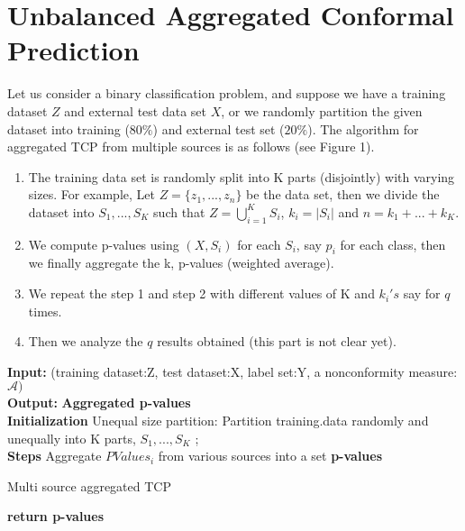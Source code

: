 \documentclass[main]{subfiles}
\begin{document}
\section{Unbalanced Aggregated Conformal Prediction}
Let us consider a binary classification problem, and suppose we have a training dataset $Z$ and  external test data set $X$, or we randomly partition the given dataset into training ($80\%$) and external test set ($20\%$). The algorithm for aggregated TCP from multiple sources is as follows (see Figure 1).
\begin{enumerate}

\item The training data set is randomly split into K parts (disjointly) with varying sizes. For example, Let $Z = \{ z_1 , ..., z_n \} $ be the data set, then we divide the dataset into $S_1, ..., S_K$ such that $Z = \bigcup_{i=1}^K S_i$, $k_i = |S_i|$ and $n = k_1+ ...+k_K$.

\item We compute p-values using  $(X,S_i)$ for each $S_i$, say $p_i$ for each class, then we finally aggregate the k, p-values (weighted average).  

\item We repeat the step 1 and step 2 with different values of K and $k_i's$ say for $q$ times.

\item  Then we analyze the $q$ results obtained (this part is not clear yet).

\end{enumerate}


 \begin{algorithm}[H]
 \textbf{Input:}{ (training dataset:Z, test dataset:X, label set:Y, a nonconformity measure:$\mathcal{A})$}\\
 \textbf{Output:}{\textbf{ Aggregated p-values} }\\
 \textbf{Initialization\;}
 Unequal size partition: Partition training.data randomly and unequally into K parts, $S_1, ..., S_K$ ;\\ %
 \textbf{Steps\;}
 Aggregate $PValues_i$ from various sources into a set \textbf{p-values}
 \caption{Multi source aggregated TCP}
 \textbf{return \textbf{p-values}}
 \end{algorithm}
 
\end{document}
